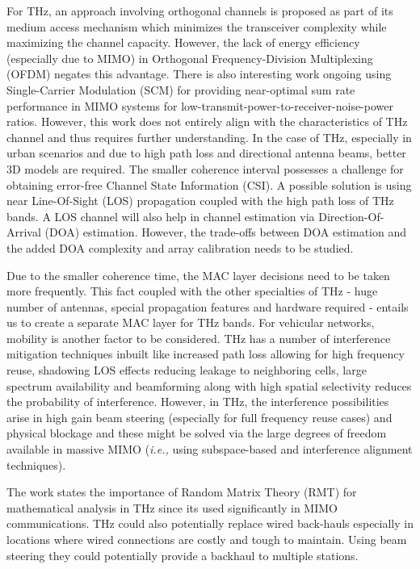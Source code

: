 \documentclass[12pt, letterpaper]{article}
\begin{document}
For THz, an approach involving orthogonal channels is proposed as part of its medium access mechanism which minimizes the transceiver complexity while maximizing the channel capacity. However, the lack of energy efficiency (especially due to MIMO) in Orthogonal Frequency-Division Multiplexing (OFDM) negates this advantage. There is also interesting work ongoing using Single-Carrier Modulation (SCM) for providing near-optimal sum rate performance in MIMO systems for low-transmit-power-to-receiver-noise-power ratios. However, this work does not entirely align with the characteristics of THz channel and thus requires further understanding. In the case of THz, especially in urban scenarios and due to high path loss and directional antenna beams, better 3D models are required. The smaller coherence interval possesses a challenge for obtaining error-free Channel State Information (CSI).  A possible solution is using near Line-Of-Sight (LOS) propagation coupled with the high path loss of THz bands. A LOS channel will also help in channel estimation via Direction-Of-Arrival (DOA) estimation. However, the trade-offs between DOA estimation and the added DOA complexity and array calibration needs to be studied.
\par
Due to the smaller coherence time, the MAC layer decisions need to be taken more frequently. This fact coupled with the other specialties of THz - huge number of antennas, special propagation features and hardware required - entails us to create a separate MAC layer for THz bands. For vehicular networks, mobility is another factor to be considered. THz has a number of interference mitigation techniques inbuilt like increased path loss allowing for high frequency reuse, shadowing LOS effects reducing leakage to neighboring cells, large spectrum availability and beamforming along with high spatial selectivity reduces the probability of interference. However, in THz, the interference possibilities arise in high gain beam steering (especially for full frequency reuse cases) and physical blockage and these might be solved via the large degrees of freedom available in massive MIMO (\emph{i.e., } using subspace-based and interference alignment techniques).
\par
The work states the importance of Random Matrix Theory (RMT) for mathematical analysis in THz since its used significantly in MIMO communications. THz could also potentially replace wired back-hauls especially in locations where wired connections are costly and tough to maintain. Using beam steering they could potentially provide a backhaul to multiple stations.  
\end{document}
